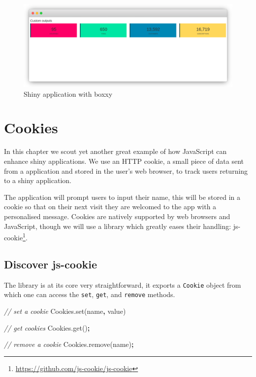 \documentclass[
]{krantz}
\makeatletter
\newenvironment{Shaded}{\begin{snugshade}}{\end{snugshade}}
\newcommand{\AttributeTok}[1]{\textcolor[rgb]{0.61,0.61,0.61}{#1}}
\newcommand{\CommentTok}[1]{\textcolor[rgb]{0.37,0.37,0.37}{\textit{#1}}}
\newcommand{\NormalTok}[1]{#1}
\newcommand{\OperatorTok}[1]{\textcolor[rgb]{0.43,0.43,0.43}{\textbf{#1}}}
\newcommand{\StringTok}[1]{\textcolor[rgb]{0.5,0.5,0.5}{#1}}
\newcommand{\VariableTok}[1]{\textcolor[rgb]{0,0,0}{#1}}
\renewcommand{\href}[2]{#2\footnote{\url{#1}}}
\newenvironment{kframe}{%
\medskip{}
\setlength{\fboxsep}{.8em}
 \def\at@end@of@kframe{}%
 \ifinner\ifhmode%
  \def\at@end@of@kframe{\end{minipage}}%
  \begin{minipage}{\columnwidth}%
 \fi\fi%
 \def\FrameCommand##1{\hskip\@totalleftmargin \hskip-\fboxsep
 \colorbox{shadecolor}{##1}\hskip-\fboxsep
     \hskip-\linewidth \hskip-\@totalleftmargin \hskip\columnwidth}%
 \MakeFramed {\advance\hsize-\width
   \@totalleftmargin\z@ \linewidth\hsize
   \@setminipage}}%
 {\par\unskip\endMakeFramed%
 \at@end@of@kframe}
\renewenvironment{Shaded}{\begin{kframe}}{\end{kframe}}
\makeatother
\begin{document}
\begin{figure}
\centering
\includegraphics{images/custom-output-boxxy.png}
\caption{Shiny application with boxxy}
\end{figure}

\hypertarget{cookies}{%
\chapter{Cookies}\label{cookies}}

In this chapter we scout yet another great example of how JavaScript can enhance shiny applications. We use an HTTP cookie, a small piece of data sent from a application and stored in the user's web browser, to track users returning to a shiny application.

The application will prompt users to input their name, this will be stored in a cookie so that on their next visit they are welcomed to the app with a personalised message. Cookies are natively supported by web browsers and JavaScript, though we will use a library which greatly eases their handling: \href{https://github.com/js-cookie/js-cookie}{js-cookie}.

\hypertarget{discover-js-cookie}{%
\section{Discover js-cookie}\label{discover-js-cookie}}

The library is at its core very straightforward, it exports a \texttt{Cookie} object from which one can access the \texttt{set}, \texttt{get}, and \texttt{remove} methods.

\begin{Shaded}
\begin{Highlighting}[]
\CommentTok{// set a cookie}
\VariableTok{Cookies}\NormalTok{.}\AttributeTok{set}\NormalTok{(}\StringTok{\textquotesingle{}name\textquotesingle{}}\OperatorTok{,} \StringTok{\textquotesingle{}value\textquotesingle{}}\NormalTok{)}

\CommentTok{// get cookies}
\VariableTok{Cookies}\NormalTok{.}\AttributeTok{get}\NormalTok{()}\OperatorTok{;}

\CommentTok{// remove a cookie}
\VariableTok{Cookies}\NormalTok{.}\AttributeTok{remove}\NormalTok{(}\StringTok{\textquotesingle{}name\textquotesingle{}}\NormalTok{)}\OperatorTok{;}
\end{Highlighting}
\end{Shaded}
\end{document}

